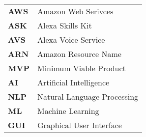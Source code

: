 \begin{flushleft}
\begin{tabular}{ll}

\textbf{AWS}	&	Amazon Web Serivces\\
\textbf{ASK}	&	Alexa Skills Kit\\
\textbf{AVS}	&	Alexa Voice Service\\
\textbf{ARN}	&	Amazon Resource Name\\
\textbf{MVP}	&	Minimum Viable Product\\
\textbf{AI}		&	Artificial Intelligence\\
\textbf{NLP}	&	Natural Language Processing\\
\textbf{ML}		&	Machine Learning\\
\textbf{GUI}	&	Graphical User Interface\\


\end{tabular}
\end{flushleft}
